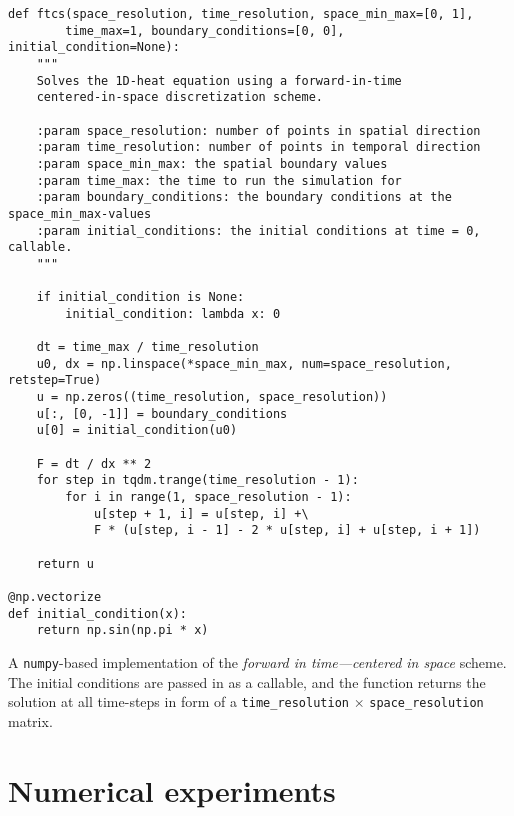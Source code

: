 \documentclass[article, a4paper, oneside]{memoir}
\begin{document}
	
	\begin{listing}
		\centering
		\begin{verbatim}
def ftcs(space_resolution, time_resolution, space_min_max=[0, 1],
		time_max=1, boundary_conditions=[0, 0], initial_condition=None):
    """
    Solves the 1D-heat equation using a forward-in-time 
    centered-in-space discretization scheme.

    :param space_resolution: number of points in spatial direction
    :param time_resolution: number of points in temporal direction
    :param space_min_max: the spatial boundary values
    :param time_max: the time to run the simulation for
    :param boundary_conditions: the boundary conditions at the space_min_max-values
    :param initial_conditions: the initial conditions at time = 0, callable.
    """

    if initial_condition is None:
        initial_condition: lambda x: 0

    dt = time_max / time_resolution
    u0, dx = np.linspace(*space_min_max, num=space_resolution, retstep=True)
    u = np.zeros((time_resolution, space_resolution))
    u[:, [0, -1]] = boundary_conditions
    u[0] = initial_condition(u0)

    F = dt / dx ** 2
    for step in tqdm.trange(time_resolution - 1):
        for i in range(1, space_resolution - 1):
            u[step + 1, i] = u[step, i] +\ 
	    	F * (u[step, i - 1] - 2 * u[step, i] + u[step, i + 1])

    return u			

@np.vectorize
def initial_condition(x):
    return np.sin(np.pi * x)
		\end{verbatim}
		\caption{A \texttt{numpy}-based implementation of the
			\emph{forward in time---centered in space} scheme. The
			initial conditions are passed in as a callable, and the
			function returns the solution at all time-steps in form
			of a \texttt{time\_resolution} \(\times\)
		\texttt{space\_resolution} matrix.}
		\label{lst:ftcs}
	\end{listing}

	\chapter{Numerical experiments}
	
	
\clearpage
\printbibliography
\end{document}
